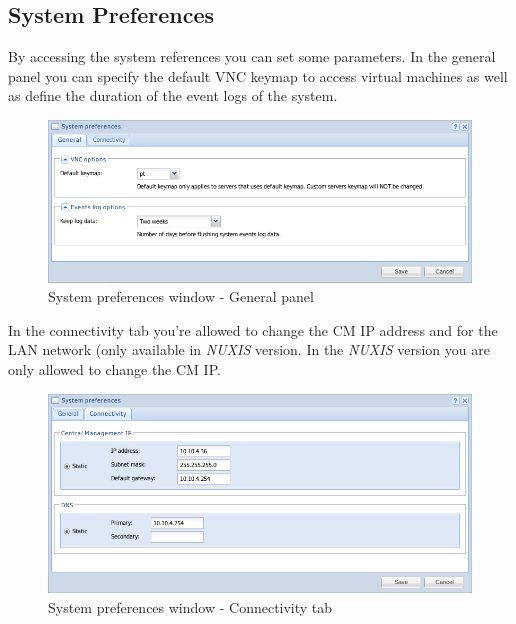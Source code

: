 \subsection{System Preferences}
By accessing the system references you can set some parameters. 
In the general panel you can specify the default VNC keymap to access virtual machines as well as define the duration of the event logs of the system.
 
\begin{figure}[H]
        \begin{center}
        \includegraphics[scale=0.5]{screenshots/preferences_general.png}
        \caption{System preferences window - General panel}
        \label{fig:preferences_general}
        \end{center}
\end{figure}

In the connectivity tab you're allowed to change the CM IP address and for the LAN network (only available in \emph{NUXIS} version. In the \emph{NUXIS} version you are only allowed to change the CM IP.

\begin{figure}[H]
        \begin{center}
        \includegraphics[scale=0.5]{screenshots/preferences_conn.png}
        \caption{System preferences window - Connectivity tab}
        \label{fig:preferences_conn}
        \end{center}
\end{figure}

